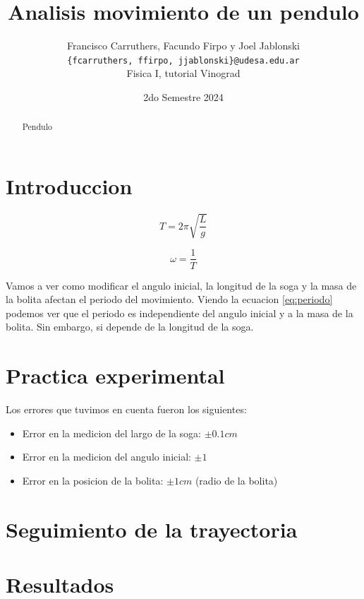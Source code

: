 \documentclass[12pt,a4]{article}
\title{Analisis movimiento de un pendulo}
\author{Francisco Carruthers, Facundo Firpo y Joel Jablonski\\ [2mm]
\small \texttt{\{fcarruthers, ffirpo, jjablonski\}@udesa.edu.ar}\\
\small Fisica I, tutorial Vinograd}
\date{2do Semestre 2024}
\begin{document}
\maketitle

\begin{abstract}
    Pendulo
\end{abstract}

\section{Introduccion}

\begin{equation}
    T = 2 \pi \sqrt{\frac{L}{g}}
    \label{eq:periodo}
\end{equation}

\begin{equation}
    \omega = \frac{1}{T}
    \label{eq:omega}
\end{equation}

Vamos a ver como modificar el angulo inicial, la longitud de la soga y la masa de la bolita afectan el periodo del movimiento. Viendo la ecuacion \ref{eq:periodo} podemos ver que el periodo es independiente del angulo inicial y a la masa de la bolita. Sin embargo, si depende de la longitud de la soga. 

\section{Practica experimental}

Los errores que tuvimos en cuenta fueron los siguientes:

\begin{itemize}
    \item Error en la medicion del largo de la soga: $\pm 0.1 cm$
    \item Error en la medicion del angulo inicial: $\pm 1$
    \item Error en la posicion de la bolita: $\pm 1 cm$ (radio de la bolita)
\end{itemize}

\section{Seguimiento de la trayectoria}


\section{Resultados}
\end{document}
